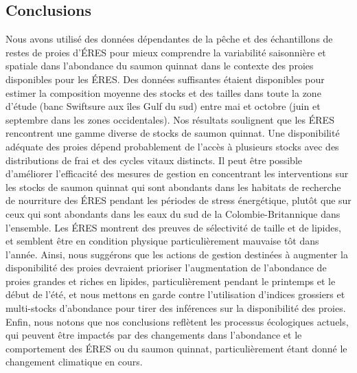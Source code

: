 \subsection{Conclusions}

Nous avons utilisé des données dépendantes de la pêche et des échantillons de restes de proies d'ÉRES pour mieux comprendre la variabilité saisonnière et spatiale dans l'abondance du saumon quinnat dans le contexte des proies disponibles pour les ÉRES. Des données suffisantes étaient disponibles pour estimer la composition moyenne des stocks et des tailles dans toute la zone d'étude (banc Swiftsure aux îles Gulf du sud) entre mai et octobre (juin et septembre dans les zones occidentales). Nos résultats soulignent que les ÉRES rencontrent une gamme diverse de stocks de saumon quinnat. Une disponibilité adéquate des proies dépend probablement de l'accès à plusieurs stocks avec des distributions de frai et des cycles vitaux distincts. Il peut être possible d'améliorer l'efficacité des mesures de gestion en concentrant les interventions sur les stocks de saumon quinnat qui sont abondants dans les habitats de recherche de nourriture des ÉRES pendant les périodes de stress énergétique, plutôt que sur ceux qui sont abondants dans les eaux du sud de la Colombie-Britannique dans l'ensemble. Les ÉRES montrent des preuves de sélectivité de taille et de lipides, et semblent être en condition physique particulièrement mauvaise tôt dans l'année. Ainsi, nous suggérons que les actions de gestion destinées à augmenter la disponibilité des proies devraient prioriser l'augmentation de l'abondance de proies grandes et riches en lipides, particulièrement pendant le printemps et le début de l'été, et nous mettons en garde contre l'utilisation d'indices grossiers et multi-stocks d'abondance pour tirer des inférences sur la disponibilité des proies. Enfin, nous notons que nos conclusions reflètent les processus écologiques actuels, qui peuvent être impactés par des changements dans l'abondance et le comportement des ÉRES ou du saumon quinnat, particulièrement étant donné le changement climatique en cours.